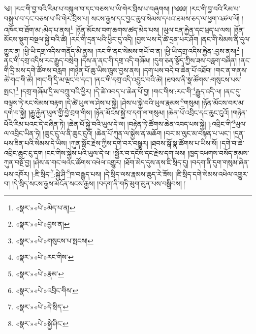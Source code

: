 ༄། །རང་གི་བྱ་བའི་རིམ་པ་བསྐུལ་བ་དང་བཅས་པ་ཡི་གེར་བྲིས་པ་བཞུགས། །༄༅༅། །རང་གི་བྱ་བའི་རིམ་པ་བསྐུལ་བ་དང་བཅས་པ་ཡི་གེར་བྲིས་པ། སངས་རྒྱས་དང་བྱང་ཆུབ་སེམས་དཔའ་ཐམས་ཅད་ལ་ཕྱག་འཚལ་ལོ། །འཁོར་བ་ཐོག་མ་:མེད་པ་ནས།\footnote{«སྣར་»«པེ་»མེད་པ་ན།} །ཉོན་མོངས་བག་ཆགས་ཚད་མེད་པས། །ཡུལ་ངན་རྐྱེན་དང་ཕྲད་པ་ལས། །ཉོན་མོངས་སྡུག་བསྔལ་སྐྱེ་བའི་ཚེ། །རང་གི་དྲན་པའི་ཕྱིར་དུ་འདི། །བྱས་པས་དེ་ཚེ་དྲན་པར་ཤོག །ནང་གི་སེམས་ནི་དུལ་གྱུར་ན། །ཕྱི་ཡི་དགྲ་འདིས་གནོད་མི་ནུས། །རང་གི་ནང་སེམས་གཡོ་བ་ན། །ཕྱི་ཡི་དགྲ་འདིས་རྐྱེན་:བྱས་ནས།\footnote{«སྣར་»«པེ་»བྱས་ན།} །ནང་གི་དགྲ་འདིས་རང་རྒྱུད་བསྲེག །དེས་ན་ནང་གི་དགྲ་འདི་གཞོམ། །དུག་ཅན་སྣོད་ཀྱིས་ཟས་བརླག་བཞིན། །ནང་གི་དྲི་མས་དགེ་ཚོགས་བརླག །གཉེན་པོ་ཆུ་ཡིས་ཁྲུས་བྱས་ནས། །དག་པས་བདེ་བ་ཆེན་པོ་འཐོབ། །གང་ན་གནས་ཚེ་གང་གི་ཚེ། །གང་གི་དྲི་མ་ལྡང་བ་དང་། །ནང་གི་དགྲ་འདི་འབྱུང་བའི་ཚེ། །ཐབས་ནི་སྣ་ཚོགས་:གསུངས་པས་སྤང་།\footnote{«སྣར་»«པེ་»གསུངས་པ་སྤངས།} །དགྲ་གཞོམ་དྲི་མ་བཀྲུ་བའི་ཕྱིར། །དེ་ཚེ་འབད་པ་ཆེན་པོ་བྱ། །གང་གིས་:རང་གི་\footnote{«སྣར་»«པེ་»རང་གིས་}རྒྱུད་འདི་ལ། །ནང་དུ་བལྟས་ཏེ་རང་སེམས་བརྟག །དེ་ཚེ་ཡུལ་ལ་ཤེས་པ་སྐྱེ། །ཤེས་པ་སྐྱེ་བའི་ཡུལ་རྣམས་\footnote{«སྣར་»«པེ་»རྣམ་}གསུམ། །ཉོན་མོངས་བར་མ་དགེ་བ་སྐྱེ། །རྒྱུ་རྐྱེན་ཡུལ་གྱི་བྱེ་བྲག་གིས། །ཉོན་མོངས་སྐྱེ་བ་དག་ལ་གསུམ། །ཆེན་པོ་འབྲིང་དང་ཆུང་ངུའོ། །གཉེན་པོའི་རིམ་པའང་དེ་བཞིན་ཏེ། །ཆེན་པོ་སྐྱེ་བའི་ཡུལ་དེ་ལ། །བརྟེན་ཏེ་ཚོགས་ཆེན་འབད་པས་སྐྱེ། །:འབྲིང་གི་\footnote{«སྣར་»«པེ་»འབྲིང་གིས་}ཡུལ་ལ་འབྲིང་ཡིན་ཏེ། །ཆུང་ངུ་ལ་ནི་ཆུང་ངུའོ། །ཆེན་པོ་ཀུན་ལ་སྐྱེས་ན་མཆོག །བར་མ་ལུང་མ་བསྟན་པ་ཡང་། །དྲན་པས་ཟིན་པའི་སེམས་དེ་ཡིས། །ཀུན་སློང་རྗེས་ཀྱིས་དགེ་བར་བསྒྱུར། །ཐབས་སྒོ་སྣ་ཚོགས་པ་ཡིས་སོ། །དགེ་བ་ཆེ་འབྲིང་ཆུང་ངུ་དག །ངང་གིས་སྐྱེས་པའི་ཡུལ་དེ་ལ། །སྦྱོར་བ་དངོས་དང་རྗེས་དག་ལས། །ཁྱད་འཕགས་བསོད་ནམས་ཀུན་བསྔོ་བྱ། །ཤེས་ན་གང་ལའང་ཚོགས་འཕེལ་འགྱུར། །ཐོག་མེད་དུས་ནས་ཇི་སྲིད་དུ། །བདག་ནི་དུག་གསུམ་ཞེན་པས་འཁོར། །:ཇི་སྲིད་\footnote{«སྣར་»«པེ་»དེ་སྲིད་}:སྐྱེ་ཤི་\footnote{«སྣར་»«པེ་»སྐྱེ་ཤིང་}ཁ་བརྒྱུད་པས། །དེ་སྲིད་ལས་རྣམས་ཆུད་རེ་ཟོས། །ཇི་སྲིད་དགེ་སེམས་འཕེལ་འགྱུར་བ། །དེ་སྲིད་སངས་རྒྱས་མངོན་སངས་རྒྱས། །བདག་ནི་གཏི་མུག་མུན་པས་བསྒྲིབས། །
